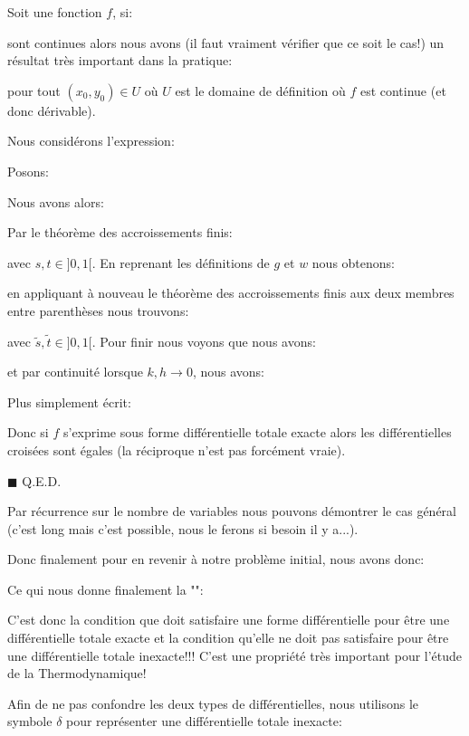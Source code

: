 	\begin{theorem}
	Soit une fonction $f$, si:
	
	sont continues alors nous avons (il faut vraiment vérifier que ce soit le cas!) un résultat très important dans la pratique:
	
	pour tout $(x_0,y_0)\in U$ où $U$ est le domaine de définition où $f$ est continue (et donc dérivable).
	\end{theorem}
	\begin{dem}
	Nous considérons l'expression:
	
	Posons:
	
	Nous avons alors:
	
	Par le théorème des accroissements finis:
	
	avec $s,t \in ]0,1[$. En reprenant les définitions de $g$ et $w$ nous obtenons:
	
	en appliquant à nouveau le théorème des accroissements finis aux deux membres entre parenthèses nous trouvons:
	
	avec $\tilde{s},\tilde{t} \in ]0,1[$. Pour finir nous voyons que nous avons:
	
	et par continuité lorsque $k,h\rightarrow 0$, nous avons:
	
	Plus simplement écrit:
	
	Donc si $f$ s'exprime sous forme différentielle totale exacte alors les différentielles croisées sont égales (la réciproque n'est pas forcément vraie).
	\begin{flushright}
		$\blacksquare$  Q.E.D.
	\end{flushright}
	\end{dem}
	Par récurrence sur le nombre de variables nous pouvons démontrer le cas général (c'est long mais c'est possible, nous le ferons si besoin il y a...). 
	
	Donc finalement pour en revenir à notre problème initial, nous avons donc:
	
	Ce qui nous donne finalement la "":
	
	C'est donc la condition que doit satisfaire une forme différentielle pour être une différentielle totale exacte et la condition qu'elle ne doit pas satisfaire pour être une différentielle totale inexacte!!! C'est une propriété très important pour l'étude de la Thermodynamique!
	
	Afin de ne pas confondre les deux types de différentielles, nous utilisons le symbole $\delta$ pour représenter une différentielle totale inexacte:
	
